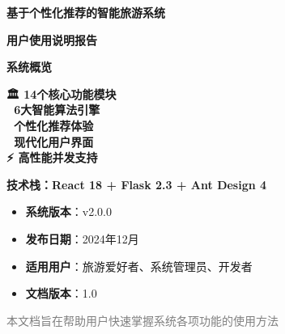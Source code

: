 \documentclass[12pt, a4paper]{article}
\begin{document}
\begin{titlepage}
\begin{center}
\vspace*{1cm}

\textcolor{primary}{\Huge\textbf{基于个性化推荐的智能旅游系统}}

\vspace{1cm}
\textcolor{secondary}{\Large\textbf{用户使用说明报告}}

\vspace{2cm}

\begin{tcolorbox}[
    enhanced,
    colback=light,
    colframe=primary,
    width=14cm,
    height=8cm,
    rounded corners=10pt,
    drop shadow,
    halign=center,
    valign=center
]

\Large\textbf{系统概览}

\vspace{0.5cm}

\begin{minipage}{0.8\textwidth}
\centering
\large
\textbf{🏛️ 14个核心功能模块} \\[0.3cm]
\textbf{🤖 6大智能算法引擎} \\[0.3cm]
\textbf{🎯 个性化推荐体验} \\[0.3cm]
\textbf{📱 现代化用户界面} \\[0.3cm]
\textbf{⚡ 高性能并发支持}
\end{minipage}

\vspace{1cm}

\textcolor{primary}{\large\textbf{技术栈：React 18 + Flask 2.3 + Ant Design 4}}

\end{tcolorbox}

\vspace{2cm}

\begin{infobox}[title={版本信息}]
\begin{itemize}[nosep]
    \item \textbf{系统版本}：v2.0.0
    \item \textbf{发布日期}：2024年12月
    \item \textbf{适用用户}：旅游爱好者、系统管理员、开发者
    \item \textbf{文档版本}：1.0
\end{itemize}
\end{infobox}

\vfill

\textcolor{gray}{\large 本文档旨在帮助用户快速掌握系统各项功能的使用方法}

\end{center}
\end{titlepage}
\end{document}
